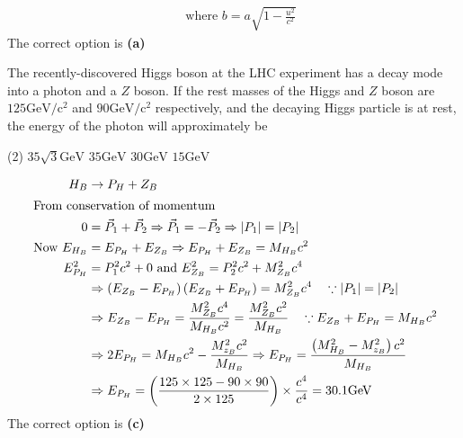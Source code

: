 \begin{enumerate}
\begin{answer}
\begin{align*}
&\text { where } b=a \sqrt{1-\frac{u^{2}}{c^{2}}}
\end{align*}
The correct option is \textbf{(a)}	
\end{answer}
\begin{minipage}{\textwidth}
	\item The recently-discovered Higgs boson at the LHC experiment has a decay mode into a photon and a $Z$ boson. If the rest masses of the Higgs and $Z$ boson are $125 \mathrm{GeV} / \mathrm{c}^{2}$ and $90 \mathrm{GeV} / \mathrm{c}^{2}$ respectively, and the decaying Higgs particle is at rest, the energy of the photon will approximately be
\end{minipage}
\begin{tasks}(2)
	\task[\textbf{A.}] $35 \sqrt{3} \mathrm{GeV}$
	\task[\textbf{B.}]$35 \mathrm{GeV}$
	\task[\textbf{C.}]$30 \mathrm{GeV}$
	\task[\textbf{D.}]$15 \mathrm{GeV}$
\end{tasks}
\begin{answer}
	\begin{align*}
	H_{B} &\rightarrow P_{H}+Z_{B}\\
	\intertext { From conservation of momentum }
	 0&=\vec{P}_{1}+\vec{P}_{2} \Rightarrow \vec{P}_{1}=-\vec{P}_{2} \Rightarrow\left|P_{1}\right|=\left|P_{2}\right|\\
	\text { Now } E_{H_{B}}&=E_{P_{H}}+E_{Z_{B}} \Rightarrow E_{P_{H}}+E_{Z_{B}}=M_{H_{B}} c^{2}\\
	E_{P_{H}}^{2}&=P_{1}^{2} c^{2}+0 \text { and } E_{Z_{B}}^{2}=P_{2}^{2} c^{2}+M_{Z_{B}}^{2} c^{4}\\
	&\Rightarrow\left(E_{Z_{B}}-E_{P_{H}}\right)\left(E_{Z_{B}}+E_{P_{H}}\right)=M_{Z_{B}}^{2} c^{4} \quad \because\left|P_{1}\right|=\left|P_{2}\right|\\
	&\Rightarrow E_{Z_{B}}-E_{P_{H}}=\frac{M_{Z_{B}}^{2} c^{4}}{M_{H_{B}} c^{2}}=\frac{M_{Z_{B}}^{2} c^{2}}{M_{H_{B}}} \quad \because E_{Z_{B}}+E_{P_{H}}=M_{H_{B}} c^{2}\\
	&\Rightarrow 2 E_{P_{H}}=M_{H_{B}} c^{2}-\frac{M_{z_{B}}^{2} c^{2}}{M_{H_{B}}} \Rightarrow E_{P_{H}}=\frac{\left(M_{H_{B}}^{2}-M_{z_{B}}^{2}\right) c^{2}}{M_{H_{B}}}\\
	&\Rightarrow E_{P_{H}}=\left(\frac{125 \times 125-90 \times 90}{2 \times 125}\right) \times \frac{c^{4}}{c^{4}}=30.1 \mathrm{GeV}
	\end{align*}
	The correct option is \textbf{(c)}
\end{answer}
\begin{minipage}{\textwidth}

\end{minipage}
\end{enumerate}
